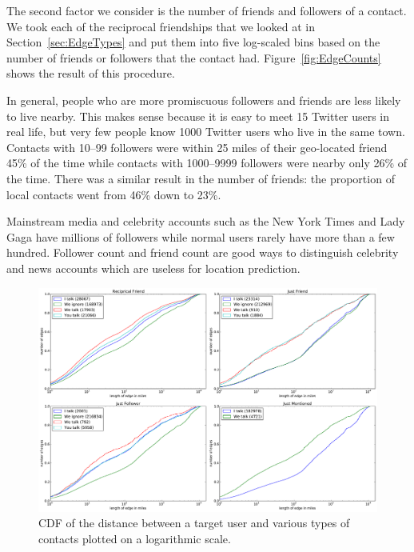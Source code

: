 \documentclass[letterpaper]{article}
\begin{document}
%
The second factor we consider is the number of friends and followers of a contact.
%
%
We took each of the reciprocal friendships that we looked at in
Section~\ref{sec:EdgeTypes} and put them into five log-scaled bins based on
the number of friends or followers that the contact had.
%
Figure~\ref{fig:EdgeCounts} shows the result of this procedure.

In general, people who are more promiscuous followers and friends are less
likely to live nearby.
%
This makes sense because it is easy to meet 15 Twitter users in real life, but
very few people know 1000 Twitter users who live in the same town.
%
Contacts with 10--99 followers were within 25 miles of their geo-located friend
45\% of the time while contacts with 1000--9999 followers were nearby only 26\%
of the time.
%
There was a similar result in the number of friends: the proportion of local
contacts went from 46\% down to 23\%.

Mainstream media and celebrity accounts such as the New York Times and Lady
Gaga have millions of followers while normal users rarely have more than a few
hundred.
%
Follower count and friend count are good ways to distinguish celebrity and news
accounts which are useless for location prediction.

\ifdefined\THESIS
    \begin{figure}[tb]
    \centering
    \includegraphics[width=.9\linewidth]{figures/com_types.pdf}
    \caption{
    CDF of the distance between a target user and various types of contacts
    plotted on a logarithmic scale.
    }
    \label{fig:ComTypes}
    \vspace{-2pt}
    \end{figure}
\fi
\end{document}
